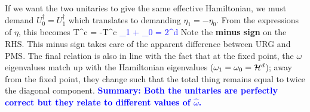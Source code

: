 \documentclass[12pt]{extarticle}
\begin{document}
\eeq
If we want the two unitaries to give the same effective Hamiltonian, we must demand \(U_0^\dagger = U_1^\dagger\) which translates to demanding \(\eta_1 = - \eta_0\). From the expressions of \(\eta\), this becomes
\beq
{}T^\dagger c = -T^\dagger c \implies \textcolor{blue}{\omega_1 + \omega_0 = 2\ham^d}
\eeq
Note the \textbf{minus sign} on the RHS. This minus sign takes care of the apparent difference between URG and PMS. The final relation is also in line with the fact that at the fixed point, the \(\omega\) eigenvalues match up with the Hamiltonian eigenvalues (\(\omega_1 = \omega_0 = \mathcal{H}^d\)); away from the fixed point, they change such that the total thing remains equal to twice the diagonal component.
\pb \textcolor{blue}{\textbf{Summary: Both the unitaries are perfectly correct but they relate to different values of \(\hat \omega\).}}
\end{document}

